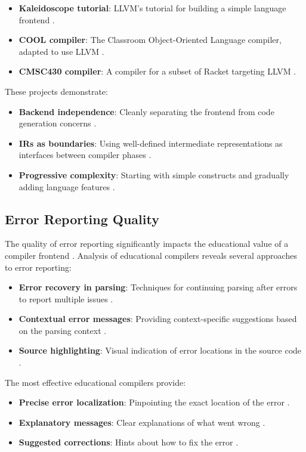 \begin{itemize}
    \item \textbf{Kaleidoscope tutorial}: LLVM's tutorial for building a simple language frontend \cite{lattner2004llvm}.
    \item \textbf{COOL compiler}: The Classroom Object-Oriented Language compiler, adapted to use LLVM \cite{aiken2003cool}.
    \item \textbf{CMSC430 compiler}: A compiler for a subset of Racket targeting LLVM \cite{hsu2020compiler}.
\end{itemize}

These projects demonstrate:
\begin{itemize}
    \item \textbf{Backend independence}: Cleanly separating the frontend from code generation concerns \cite{lattner2004llvm}.
    \item \textbf{IRs as boundaries}: Using well-defined intermediate representations as interfaces between compiler phases \cite{lattner2004llvm}.
    \item \textbf{Progressive complexity}: Starting with simple constructs and gradually adding language features \cite{aiken2003cool}.
\end{itemize}

\subsection{Error Reporting Quality}

The quality of error reporting significantly impacts the educational value of a compiler frontend \cite{traver2010compiler}. Analysis of educational compilers reveals several approaches to error reporting:

\begin{itemize}
    \item \textbf{Error recovery in parsing}: Techniques for continuing parsing after errors to report multiple issues \cite{aho2007compilers}.
    \item \textbf{Contextual error messages}: Providing context-specific suggestions based on the parsing context \cite{traver2010compiler}.
    \item \textbf{Source highlighting}: Visual indication of error locations in the source code \cite{horwitz2007student}.
\end{itemize}

The most effective educational compilers provide:
\begin{itemize}
    \item \textbf{Precise error localization}: Pinpointing the exact location of the error \cite{horwitz2007student}.
    \item \textbf{Explanatory messages}: Clear explanations of what went wrong \cite{traver2010compiler}.
    \item \textbf{Suggested corrections}: Hints about how to fix the error \cite{traver2010compiler}.
\end{itemize}

